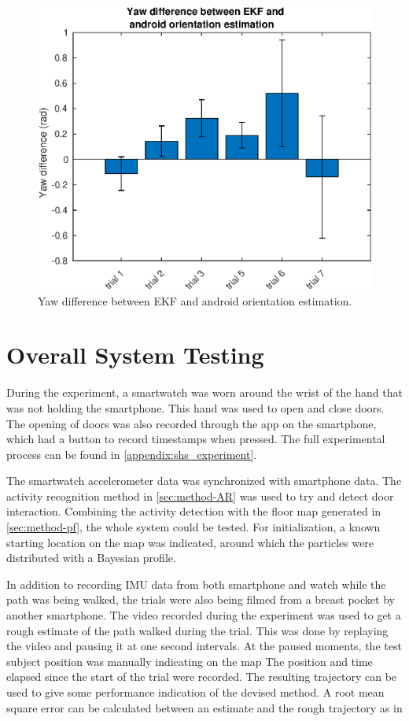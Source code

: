 \begin{figure}[H]
	\centering
	\includegraphics[width=0.65\linewidth]{images/20201118_1616_yaw_difference_between_android_and_EKF_1}
	\setlength{\belowcaptionskip}{-20pt}
	\caption{Yaw difference between EKF and android orientation estimation.}
	\label{fig:yaw_difference_between_android_and_ekf_1}
\end{figure}

\section{Overall System Testing}

During the experiment, a smartwatch was worn around the wrist of the hand that was not holding the smartphone. This hand was used to open and close doors. The opening of doors was also recorded through the app on the smartphone, which had a button to record timestamps when pressed. The full experimental process can be found in \cref{appendix:shs_experiment}. \par

The smartwatch accelerometer data was synchronized with smartphone data. The activity recognition method in \cref{sec:method-AR} was used to try and detect door interaction. Combining the activity detection with the floor map generated in \cref{sec:method-pf}, the whole system could be tested. For initialization, a known starting location on the map was indicated, around which the particles were distributed with a Bayesian profile.  \par 

In addition to recording IMU data from both smartphone and watch while the path was being walked, the trials were also being filmed from a breast pocket by another smartphone. The video recorded during the experiment was used to get a rough estimate of the path walked during the trial. This was done by replaying the video and pausing it at one second intervals. At the paused moments, the test subject position was manually indicating on the map The position and time elapsed since the start of the trial were recorded. The resulting trajectory can be used to give some performance indication of the devised method. A root mean square error can be calculated between an estimate and the rough trajectory as in

